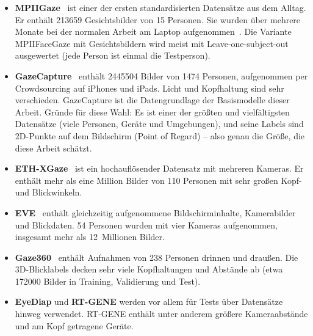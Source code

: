\begin{itemize}
  \item \textbf{MPIIGaze}~\cite{zhang2015mpiigaze} ist einer der ersten
        standardisierten Datensätze aus dem Alltag. Er enthält \num{213659}
        Gesichtsbilder von 15 Personen. Sie wurden über mehrere Monate bei der
        normalen Arbeit am Laptop aufgenommen~\cite{zhang2019mpiigaze}. Die
        Variante MPIIFaceGaze mit Gesichtsbildern wird meist mit
        Leave-one-subject-out ausgewertet (jede Person ist einmal die
        Testperson).
  \item \textbf{GazeCapture}~\cite{krafka2016itracker} enthält \num{2445504}
        Bilder von \num{1474} Personen, aufgenommen per Crowdsourcing auf
        iPhones und iPads. Licht und Kopfhaltung sind sehr verschieden.
        GazeCapture ist die Datengrundlage der Basismodelle dieser Arbeit.
        Gründe für diese Wahl: Es ist einer der größten und vielfältigsten
        Datensätze (viele Personen, Geräte und Umgebungen), und seine Labels
        sind 2D-Punkte auf dem Bildschirm (Point of Regard) -- also genau die
        Größe, die diese Arbeit schätzt.
  \item \textbf{ETH-XGaze}~\cite{zhang2020ethxgaze} ist ein hochauflösender
        Datensatz mit mehreren Kameras. Er enthält mehr als eine Million Bilder
        von 110 Personen mit sehr großen Kopf- und Blickwinkeln.
  \item \textbf{EVE}~\cite{park2020eve} enthält gleichzeitig aufgenommene
        Bildschirminhalte, Kamerabilder und Blickdaten. 54 Personen wurden mit
        vier Kameras aufgenommen, insgesamt mehr als 12~Millionen Bilder.
  \item \textbf{Gaze360}~\cite{kellnhofer2019gaze360} enthält Aufnahmen von
        238 Personen drinnen und draußen. Die 3D-Blicklabels decken sehr viele
        Kopfhaltungen und Abstände ab (etwa \num{172000} Bilder in Training,
        Validierung und Test).
  \item \textbf{EyeDiap} und \textbf{RT-GENE} werden vor allem für Tests über
        Datensätze hinweg verwendet. RT-GENE enthält unter anderem größere
        Kameraabstände und am Kopf getragene Geräte.
\end{itemize}

